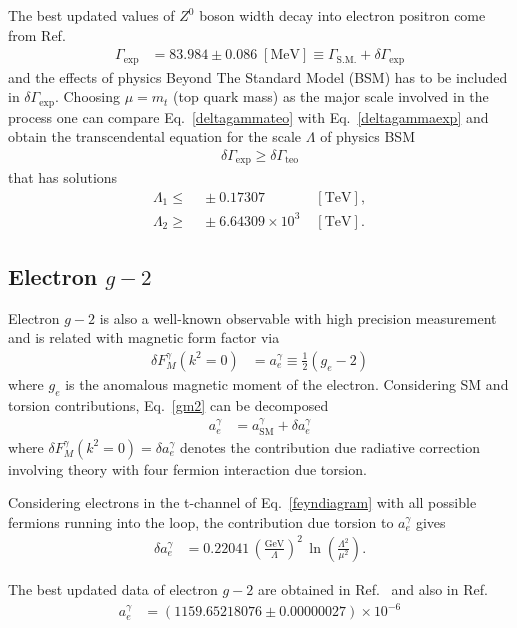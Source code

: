 The best updated values of $Z^0$ boson width decay into electron positron come from Ref.~\cite{Beringer:1900zz}
\begin{align}
\label{deltagammaexp}
 \Gamma_{\text{exp}} &= 83.984 \pm 0.086\;[\text{MeV}] \equiv \Gamma_{\text{S.M.}} + \delta\Gamma_{\text{exp}}
\end{align}
and the effects of physics Beyond The Standard Model (BSM) has to be included in $\delta\Gamma_{\text{exp}}$. Choosing $\mu = m_t$ (top quark mass) as the major scale involved in the process one can compare Eq.~\eqref{deltagammateo} with Eq.~\eqref{deltagammaexp} and obtain the transcendental equation for the scale $\Lambda$ of physics BSM 
\begin{align}
\delta\Gamma_{\text{exp}} \geq \delta\Gamma_{\text{teo}}
\end{align}
that has solutions
\begin{eqnarray}
 \label{lowscalefromz}
 \Lambda_1 \leq&\; \pm0.17307\;&[\text{TeV}], \\
 \label{upscalefromz}
 \Lambda_2 \geq&\; \pm6.64309\times10^3\;&[\text{TeV}].
\end{eqnarray}

\subsection{Electron $g-2$}

Electron $g-2$ is also a well-known observable with high precision measurement and is related with magnetic form factor via
\begin{align}
\label{gm2}
\delta F_M^\gamma(k^2=0) &= a_e^\gamma \equiv \frac{1}{2}\left(g_e-2\right)
\end{align}
where $g_e$ is the anomalous magnetic moment of the electron. Considering SM and torsion contributions, Eq.~\eqref{gm2} can be decomposed
\begin{align}
a_e^\gamma &= a_{\text{SM}}^\gamma + \delta a_e^\gamma
\end{align}
where $\delta F_M^\gamma(k^2=0) = \delta a_e^\gamma$ denotes the contribution due radiative correction involving theory with four fermion interaction due torsion. 

Considering electrons in the t-channel of Eq.~\eqref{feyndiagram} with all possible fermions running into the loop, the contribution due torsion to $a_e^\gamma$ gives
\begin{align}
 \delta a_e^\gamma &= 0.22041\,\left(\frac{\text{GeV}}{\Lambda}\right)^2\,\ln\left(\frac{\Lambda^2}{\mu^2}\right).
\end{align}

The best updated data of electron $g-2$ are obtained in Ref.~\cite{Hanneke:2008tm} and also in Ref.~\cite{Beringer:1900zz}
\begin{align}
 a_e^\gamma &= (1159.65218076\pm0.00000027)\times10^{-6}
\end{align}

